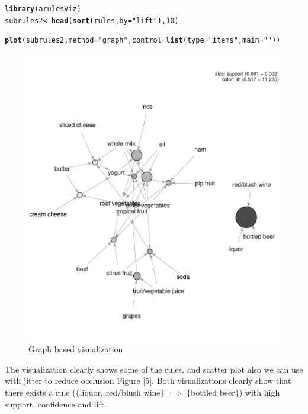 \documentclass{article}\usepackage[]{graphicx}\usepackage[]{color}
\makeatletter
\def\maxwidth{ %
  \ifdim\Gin@nat@width>\linewidth
    \linewidth
  \else
    \Gin@nat@width
  \fi
}
\newcommand{\hlnum}[1]{\textcolor[rgb]{0.686,0.059,0.569}{#1}}%
\newcommand{\hlstr}[1]{\textcolor[rgb]{0.192,0.494,0.8}{#1}}%
\newcommand{\hlstd}[1]{\textcolor[rgb]{0.345,0.345,0.345}{#1}}%
\newcommand{\hlkwb}[1]{\textcolor[rgb]{0.69,0.353,0.396}{#1}}%
\newcommand{\hlkwc}[1]{\textcolor[rgb]{0.333,0.667,0.333}{#1}}%
\newcommand{\hlkwd}[1]{\textcolor[rgb]{0.737,0.353,0.396}{\textbf{#1}}}%
\newenvironment{kframe}{%
 \def\at@end@of@kframe{}%
 \ifinner\ifhmode%
  \def\at@end@of@kframe{\end{minipage}}%
  \begin{minipage}{\columnwidth}%
 \fi\fi%
 \def\FrameCommand##1{\hskip\@totalleftmargin \hskip-\fboxsep
 \colorbox{shadecolor}{##1}\hskip-\fboxsep
     \hskip-\linewidth \hskip-\@totalleftmargin \hskip\columnwidth}%
 \MakeFramed {\advance\hsize-\width
   \@totalleftmargin\z@ \linewidth\hsize
   \@setminipage}}%
 {\par\unskip\endMakeFramed%
 \at@end@of@kframe}
\newenvironment{knitrout}{}{} %
\makeatother
\begin{document}
\begin{knitrout}
\color{fgcolor}\begin{kframe}
\begin{alltt}
\hlkwd{library}\hlstd{(arulesViz)}
\hlstd{subrules2} \hlkwb{<-} \hlkwd{head}\hlstd{(}\hlkwd{sort}\hlstd{(rules,} \hlkwc{by}\hlstd{=}\hlstr{"lift"}\hlstd{),} \hlnum{10}\hlstd{)}

\hlkwd{plot}\hlstd{(subrules2,} \hlkwc{method}\hlstd{=}\hlstr{"graph"}\hlstd{,}\hlkwc{control}\hlstd{=}\hlkwd{list}\hlstd{(}\hlkwc{type}\hlstd{=}\hlstr{"items"}\hlstd{,}\hlkwc{main}\hlstd{=}\hlstr{""}\hlstd{))}
\end{alltt}
\end{kframe}\begin{figure}
\includegraphics[width=\maxwidth]{figure/unnamed-chunk-11-1} \caption[Graph based visualization]{Graph based visualization}\label{fig:unnamed-chunk-11}
\end{figure}


\end{knitrout}
\hspace{0.5cm} The visualization clearly shows some of the rules, and scatter plot also we can use with jitter to reduce occlusion Figure [5]. Both visualizations clearly show that there exists a rule ($\{$liquor, red/blush wine$\}$ $\implies$ $\{$bottled beer$\}$) with high support, confidence and lift\cite{[5]}.
\end{document}
